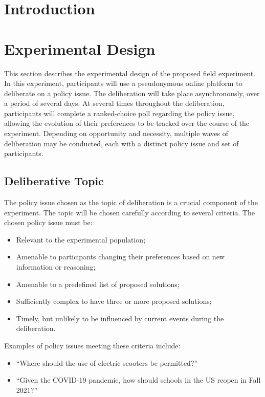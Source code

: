 \section{Introduction}



\section{Experimental Design}

This section describes the experimental design of the proposed field experiment.
In this experiment, participants will use a pseudonymous online platform
to deliberate on a policy issue.
The deliberation will take place asynchronously, over a period of several days.
At several times throughout the deliberation,
participants will complete a ranked-choice poll regarding the policy issue,
allowing the evolution of their preferences to be tracked over the course of the
experiment.
Depending on opportunity and necessity, multiple waves of deliberation may
be conducted, each with a distinct policy issue and set of participants.


\subsection{Deliberative Topic}
The policy issue chosen as the topic of deliberation is a crucial component
of the experiment.
The topic will be chosen carefully according to several criteria.
The chosen policy issue must be:
\begin{itemize}
\item Relevant to the experimental population;
\item Amenable to participants changing their preferences based on new information or reasoning;
\item Amenable to a predefined list of proposed solutions;
\item Sufficiently complex to have three or more proposed solutions;
\item Timely, but unlikely to be influenced by current events during the deliberation.
\end{itemize}
Examples of policy issues meeting these criteria include:
\begin{itemize}
\item ``Where should the use of electric scooters be permitted?''
\item ``Given the COVID-19 pandemic, how should schools in the US reopen in Fall 2021?''
\end{itemize}


